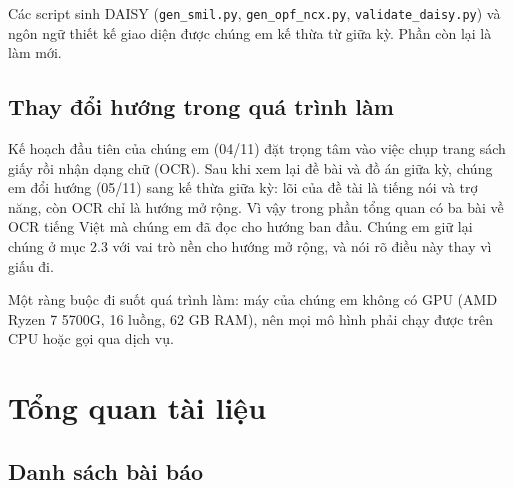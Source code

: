 \documentclass[12pt,a4paper]{article}
\begin{document}
Các script sinh DAISY (\texttt{gen\_smil.py}, \texttt{gen\_opf\_ncx.py}, \texttt{validate\_daisy.py}) và ngôn ngữ thiết kế giao diện được chúng em kế thừa từ giữa kỳ. Phần còn lại là làm mới.

\subsection{Thay đổi hướng trong quá trình làm}

Kế hoạch đầu tiên của chúng em (04/11) đặt trọng tâm vào việc chụp trang sách giấy rồi nhận dạng chữ (OCR). Sau khi xem lại đề bài và đồ án giữa kỳ, chúng em đổi hướng (05/11) sang kế thừa giữa kỳ: lõi của đề tài là tiếng nói và trợ năng, còn OCR chỉ là hướng mở rộng. Vì vậy trong phần tổng quan có ba bài về OCR tiếng Việt mà chúng em đã đọc cho hướng ban đầu. Chúng em giữ lại chúng ở mục 2.3 với vai trò nền cho hướng mở rộng, và nói rõ điều này thay vì giấu đi.

Một ràng buộc đi suốt quá trình làm: máy của chúng em không có GPU (AMD Ryzen 7 5700G, 16 luồng, 62 GB RAM), nên mọi mô hình phải chạy được trên CPU hoặc gọi qua dịch vụ.

\section{Tổng quan tài liệu}

\subsection{Danh sách bài báo}
\end{document}
